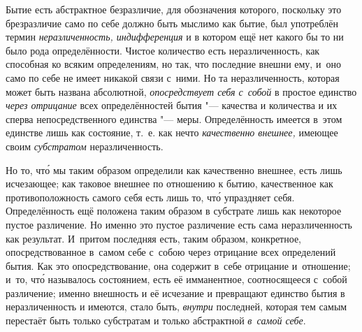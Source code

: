 
Бытие есть абстрактное безразличие, для обозначения которого, поскольку это
брезразличие само по себе должно быть мыслимо как бытие, был употреблён
термин {\em неразличенность, индифференция}
и в котором ещё нет какого бы то ни было рода определённости. Чистое количество
есть неразличенность, как способная ко всяким определениям, но так, что
последние внешни ему, и~оно само по себе не имеет никакой связи с~ними. Но та
неразличенность, которая может быть названа абсолютной, {\em опосредствует себя
с~собой} в простое единство {\em через отрицание} всех определённостей бытия
"--- качества и количества и их сперва непосредственного единства "--- меры.
Определённость имеется в~этом единстве лишь как состояние, т.~е. как нечто
{\em качественно внешнее,} имеющее своим {\em субстратом} неразличенность.

Но то, чт\'{о} мы таким образом определили как качественно внешнее, есть лишь
исчезающее; как таковое внешнее по отношению к бытию, качественное как
противоположность самого себя есть лишь то, чт\'{о} упраздняет себя.
Определённость ещё положена таким образом в субстрате лишь как некоторое пустое
различение. Но именно это пустое различение есть сама неразличенность
как результат. И~притом последняя есть, таким образом, конкретное,
опосредствованное в~самом себе с~собою через отрицание всех определений бытия.
Как это опосредствование, она содержит в~себе отрицание и~отношение; и~то,
чт\'{о} называлось состоянием, есть её имманентное, соотносящееся с~собой
различение; именно внешность и её исчезание и превращают единство бытия
в неразличенность и имеются, стало быть, {\em внутри} последней, которая тем
самым перестаёт быть только субстратам и только абстрактной {\em в~самой себе}.

